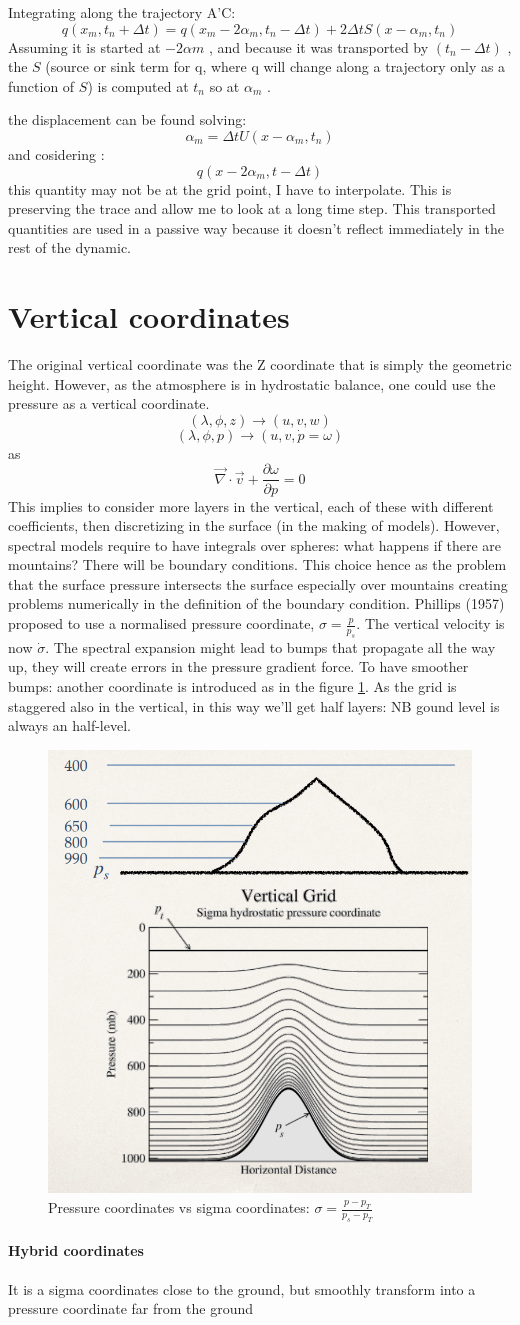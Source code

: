 Integrating along the trajectory A'C:
$$q(x_m,t_n+\Delta t)=q(x_m-2\alpha_m,t_n-\Delta t)+2\Delta tS(x-\alpha_m,t_n)$$
Assuming it is started at $-2\alpha m$ , and because it was transported by $(t_n - \Delta t)$ , the $S$ (source or sink term for q, where q will change along a trajectory only as a function of $S$) is computed at $t_n$ so at $\alpha_m$ .

the displacement can be found solving:
$$\alpha_m=\Delta tU(x-\alpha_m,t_n)$$
and cosidering :
$$q(x-2\alpha_m,t-\Delta t)$$ this quantity may not be at the grid point, I have to interpolate. This is preserving the trace and allow me to look at a long time step. This transported quantities are used in a passive way because it doesn't reflect immediately in the rest of the dynamic.

\section{Vertical coordinates}
The original vertical coordinate was the Z coordinate that is simply the
geometric height. However, as the atmosphere is in hydrostatic balance, one could use the pressure as a vertical coordinate.
$$(\lambda, \phi, z)\rightarrow(u,v,w) $$
$$(\lambda, \phi, p)\rightarrow (u,v,\dot{p}=\omega)$$
as $$\vec{\nabla}\cdot\vec{v}+\frac{\partial\omega}{\partial p}=0$$
This implies to consider more layers in the vertical, each of these with different coefficients, then discretizing in the surface (in the making of models). However, spectral models require to have integrals over spheres: what happens if there are mountains? There will be boundary conditions.
This choice hence as the
problem that the surface pressure intersects the surface especially over
mountains creating problems numerically in the definition of the boundary
condition.
Phillips (1957) proposed to use a normalised pressure coordinate, $\sigma=\frac{p}{p_s}$. The vertical velocity is now $\dot{\sigma}$. The spectral expansion might lead to bumps that propagate all the way up, they will create errors in the pressure gradient force. To have smoother bumps: another coordinate is introduced as in the figure \ref{fig:sigmababy}. As the grid is staggered also in the vertical, in this way we'll get half layers: NB gound level is always an half-level.
\begin{figure}[h!]
	\centering
	\includegraphics[width=0.5\linewidth]{uploads/Screenshot 2024-11-19 143432.png}
	\caption{Pressure coordinates vs sigma coordinates: $\sigma=\frac{p-p_T}{p_s-p_T}$}
	\label{fig:sigmababy}
\end{figure}
\paragraph{Hybrid coordinates}
It is a sigma coordinates close to the ground, but smoothly transform into a
pressure coordinate far from the ground
